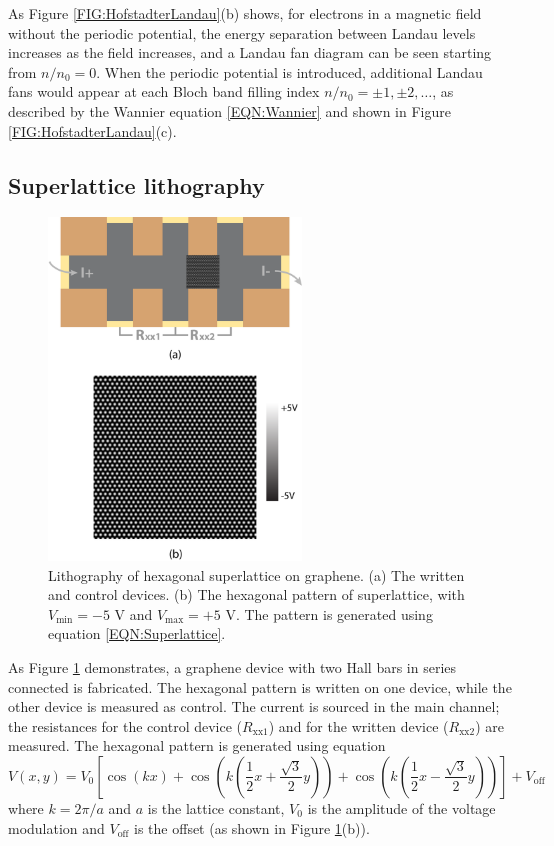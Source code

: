 \documentclass[pdflatex, sectionletters, 12pt, final, phd]{pittetd}    %
\begin{document}
As Figure \ref{FIG:HofstadterLandau}(b) shows, for electrons in a magnetic field without the periodic potential, the energy separation between Landau levels increases as the field increases, and a Landau fan diagram can be seen starting from $n/n_0 = 0$. When the periodic potential is introduced, additional Landau fans would appear at each Bloch band filling index $n/n_0 = \pm 1, \pm 2, \ldots$, as described by the Wannier equation \ref{EQN:Wannier} and shown in Figure \ref{FIG:HofstadterLandau}(c). 

\subsection{Superlattice lithography}

\begin{figure}[h!]
	\centering
	\includegraphics[width=0.6\textwidth]{Drawing/SuperlatticeWriting.pdf}
	\caption[Lithography of hexagonal superlattice on graphene]{Lithography of hexagonal superlattice on graphene. (a) The written and control devices. (b) The hexagonal pattern of superlattice, with $V_\mathrm{min} = -5$ V and $V_\mathrm{max} = +5$ V. The pattern is generated using equation \ref{EQN:Superlattice}.}
	\label{FIG:SuperlatticeWriting}
\end{figure}

As Figure \ref{FIG:SuperlatticeWriting} demonstrates, a graphene device with two Hall bars in series connected is fabricated. The hexagonal pattern is written on one device, while the other device is measured as control. The current is sourced in the main channel; the resistances for the control device ($R_\mathrm{xx1}$) and for the written device ($R_\mathrm{xx2}$) are measured. The hexagonal pattern is generated using equation
\begin{equation}
\label{EQN:Superlattice}
V(x, y) = V_0 \left[\cos(kx) + \cos\left( k \left( \frac{1}{2}  x + \frac{\sqrt{3}}{2} y \right) \right) + \cos \left( k \left( \frac{1}{2} x - \frac{\sqrt{3}}{2} y \right) \right) \right] + V_\mathrm{off}
\end{equation}
where $k = 2\pi/a$ and $a$ is the lattice constant, $V_0$ is the amplitude of the voltage modulation and $V_\mathrm{off}$ is the offset (as shown in Figure \ref{FIG:SuperlatticeWriting}(b)). 
\end{document}
